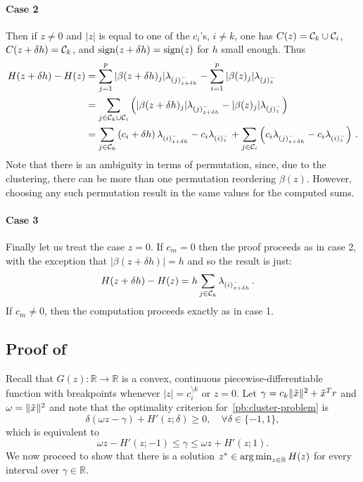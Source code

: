 \paragraph{Case 2}
Then if  $z \neq 0$ and $|z|$ is equal to one of the $c_i$'s, $i \neq k$,  one has $C(z) = \mathcal{C}_k \cup \mathcal{C}_i$, $C(z + \delta h) = \mathcal{C}_k$, and $\operatorname{sign}(z + \delta h) = \operatorname{sign}(z)$ for $h$ small enough.
Thus
\begin{align}
	H(z + \delta h) - H(z)
	 & = \sum_{j =1}^p |\beta(z + \delta h)_j| \lambda_{(j)^-_{z + \delta h}}
	- \sum_{i=1}^p |\beta(z)_j| \lambda_{(j)^-_z}  \nonumber                                         \\
	 & = \sum_{j \in \mathcal{C}_k \cup \mathcal{C}_i} \left( |\beta(z + \delta h)_j| \lambda_{(j)^-_{z + \delta h}}
	- |\beta(z)_j| \lambda_{(j)^-_z} \right)  \nonumber                                              \\
	 & = \sum_{j \in \mathcal{C}_k} \left( c_i + \delta h \right) \lambda_{(i)^-_{z + \delta h}}
	- c_i \lambda_{(i)^-_z}
	+ \sum_{j \in \mathcal{C}_i} \left( c_i \lambda_{(j)^-_{z + \delta h}}
	- c_i \lambda_{(i)^-_z} \right) \, .
\end{align}
Note that there is an ambiguity in terms of permutation, since, due to the clustering, there can be more than one permutation reordering $\beta(z)$.
However, choosing any such permutation result in the same values for the computed sums.

\paragraph{Case 3} Finally let us treat the case $z = 0$.
If $c_m = 0$ then the proof proceeds as in case 2, with the exception that $|\beta(z + \delta h)| = h$ and so the result is just:
\begin{align}
	H(z + \delta h) - H(z)
	 & = h \sum_{j \in \mathcal{C}_k} \lambda_{(i)^-_{z + \delta h}} \, .
\end{align}
If $c_m \neq 0$, then the computation proceeds exactly as in case 1.

\subsection{Proof of }

Recall that \(G(z) : \mathbb{R} \to \mathbb{R}\) is a convex,
continuous piecewise-differentiable function with breakpoints whenever \(|z| =
c_i^{\setminus k}\) or \(z = 0\). Let \(\gamma = c_k \lVert {\tilde{x}} \rVert^2+ \tilde x^T r\)
and \(\omega = \lVert {\tilde{x}} \rVert^2\) and note that the optimality criterion
for~\eqref{pb:cluster-problem} is
\[
	\delta(\omega z - \gamma) + H'(z; \delta) \geq 0, \quad
	\forall \delta \in \{-1, 1\},
\]
which is equivalent to
\begin{equation}
	\label{eq:optimality-inequality}
	\omega z - H'(z; -1) \leq \gamma \leq \omega z + H'(z; 1).
\end{equation}
We now proceed to show that there is a solution \(z^* \in \operatorname*{arg\,min}_{z \in
	\mathbb{R}} H(z)\) for every interval over \(\gamma \in \mathbb{R}\).

